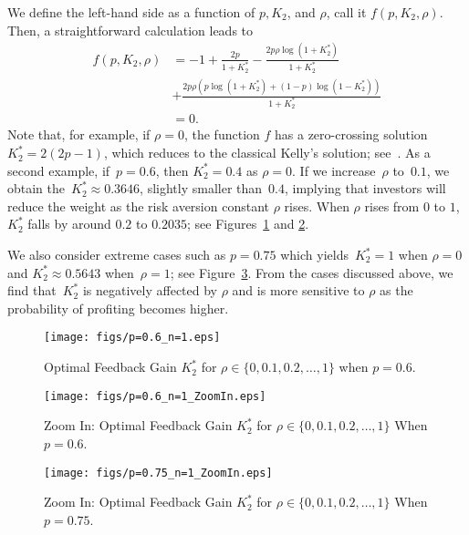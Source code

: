 We define the left-hand side as a function of $p, K_2$, and $\rho$, call it $f(p, K_2, \rho)$. Then, a straightforward calculation leads to
\begin{align*}
    f(p, K_2, \rho)
    & =-1 + \frac{2p}{1+K_2^*}-\frac{2p\rho\log( 1 + K_2^* )}{ 1 + K_2^*}\\
    & + \frac{2p\rho\left( p\log(1 + K_2^*)+(1-p)\log(1-K_2^*)\right)}{1+K_2^*}\\
    & =0.
\end{align*}
Note that, for example, if $\rho = 0$, the function $f$ has a zero-crossing solution $K_2^* = 2(2p - 1)$, which reduces to the classical Kelly's solution; see~\cite{Kelly_1956, hsieh2019contributions}.
As a second example, if~$p=0.6$, then $K_2^*=0.4$ as $\rho = 0$. If we increase~$\rho$ to~$0.1$, we obtain the~$K_2^* \approx 0.3646$, slightly smaller than~$0.4$, implying that investors will reduce the weight as the risk aversion constant $\rho$ rises. 
When $\rho$ rises from $0$ to $1$, $K_2^*$ falls by around $0.2$ to $0.2035$; see Figures~\ref{fig: small p} and \ref{fig: small p zoom in}.

We also consider extreme cases such as $p = 0.75$ which yields~$K_2^* = 1$ when $\rho = 0$ and $K_2^* \approx 0.5643$ when~$\rho = 1$; see Figure~\ref{fig: large p zoom in}. From the cases discussed above, we find that~$K_2^*$ is negatively affected by $\rho$ and is more sensitive to $\rho$ as the probability of profiting becomes higher.


\begin{figure}[h!]
    \centering
    \texttt{[image: figs/p=0.6\_n=1.eps]}
    \caption{Optimal Feedback Gain $K_2^*$ for $\rho \in \{0, 0.1, 0.2, \dots, 1\}$ when $p=0.6$.}
    \label{fig: small p}
\end{figure}

\begin{figure}[h!]
    \centering
    \texttt{[image: figs/p=0.6\_n=1\_ZoomIn.eps]}
    \caption{Zoom In: Optimal Feedback Gain $K_2^*$ for $\rho \in \{0, 0.1, 0.2, \dots, 1\}$ When $p=0.6$.}
    \label{fig: small p zoom in}
\end{figure}



\begin{figure}[h!]
    \centering
    \texttt{[image: figs/p=0.75\_n=1\_ZoomIn.eps]}
    \caption{Zoom In: Optimal Feedback Gain $K_2^*$ for $\rho \in \{0, 0.1, 0.2, \dots, 1\}$ When $p = 0.75$.}
    \label{fig: large p zoom in}
\end{figure}

